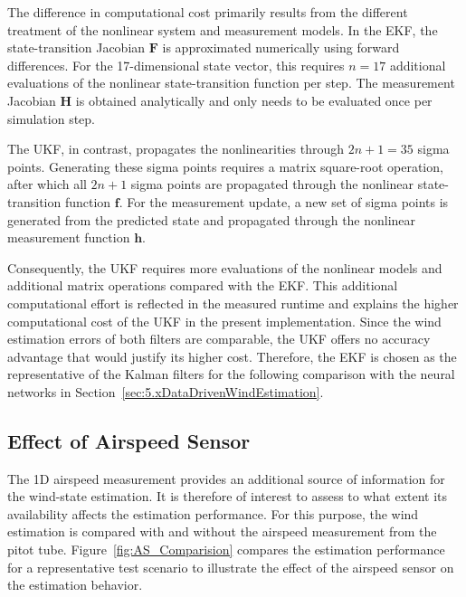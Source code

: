 The difference in computational cost primarily results from the different treatment of the nonlinear system and measurement models. In the EKF, the state-transition Jacobian $\bm{F}$ is approximated numerically using forward differences. For the 17-dimensional state vector, this requires $n=17$ additional evaluations of the nonlinear state-transition function per step. The measurement Jacobian $\bm{H}$ is obtained analytically and only needs to be evaluated once per simulation step.

The UKF, in contrast, propagates the nonlinearities through $2n+1=35$ sigma points. Generating these sigma points requires a matrix square-root operation, after which all $2n+1$ sigma points are propagated through the nonlinear state-transition function $\bm{f}$. For the measurement update, a new set of sigma points is generated from the predicted state and propagated through the nonlinear measurement function $\bm{h}$. 

Consequently, the UKF requires more evaluations of the nonlinear models and additional matrix operations compared with the EKF. This additional computational effort is reflected in the measured runtime and explains the higher computational cost of the UKF in the present implementation.
Since the wind estimation errors of both filters are comparable, the UKF offers no accuracy advantage that would justify its higher cost. Therefore, the EKF is chosen as the representative of the Kalman filters for the following comparison with the neural networks in Section~\ref{sec:5.xDataDrivenWindEstimation}.





\subsection{Effect of Airspeed Sensor}

The 1D airspeed measurement provides an additional source of information for the wind-state estimation. It is therefore of interest to assess to what extent its availability affects the estimation performance. For this purpose, the wind estimation is compared with and without the airspeed measurement from the pitot tube. 
Figure~\ref{fig:AS_Comparision} compares the estimation performance for a representative test scenario to illustrate the effect of the airspeed sensor on the estimation behavior.


